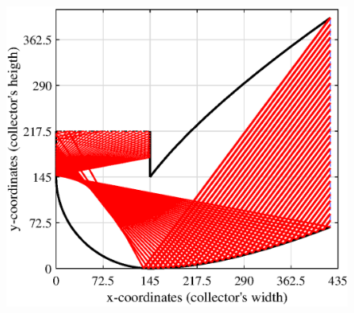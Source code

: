 \begin{figure}[ht!]
	\begin{minipage}{0.48\columnwidth}
		\includegraphics[scale=0.45]{figs/RT2D-hts72.eps}
		

\end{minipage}
\end{figure}
